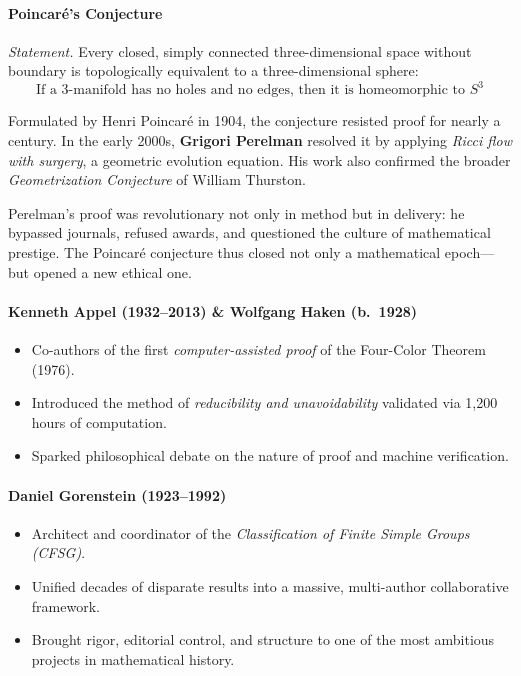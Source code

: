 \documentclass[9pt]{article}
\begin{document}
\paragraph{Poincaré's Conjecture}
\textit{Statement.} Every closed, simply connected three-dimensional space without boundary is topologically equivalent to a three-dimensional sphere:
\[
\text{If a 3-manifold has no holes and no edges, then it is homeomorphic to } S^3
\]

\noindent Formulated by Henri Poincaré in 1904, the conjecture resisted proof for nearly a century. In the early 2000s, \textbf{Grigori Perelman} resolved it by applying \textit{Ricci flow with surgery}, a geometric evolution equation. His work also confirmed the broader \textit{Geometrization Conjecture} of William Thurston.

\medskip

\noindent Perelman’s proof was revolutionary not only in method but in delivery: he bypassed journals, refused awards, and questioned the culture of mathematical prestige. The Poincaré conjecture thus closed not only a mathematical epoch—but opened a new ethical one.


\paragraph{Kenneth Appel (1932--2013) \& Wolfgang Haken (b.\ 1928)}
\begin{itemize}
  \item Co-authors of the first \textit{computer-assisted proof} of the Four-Color Theorem (1976).
  \item Introduced the method of \textit{reducibility and unavoidability} validated via 1,200 hours of computation.
  \item Sparked philosophical debate on the nature of proof and machine verification.
\end{itemize}

\paragraph{Daniel Gorenstein (1923--1992)}
\begin{itemize}
  \item Architect and coordinator of the \textit{Classification of Finite Simple Groups (CFSG)}.
  \item Unified decades of disparate results into a massive, multi-author collaborative framework.
  \item Brought rigor, editorial control, and structure to one of the most ambitious projects in mathematical history.
\end{itemize}
\end{document}
